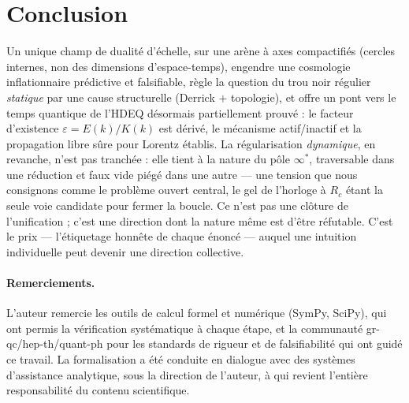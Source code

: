 \documentclass[11pt,a4paper]{article}
\theoremstyle{definition}
\begin{document}
\section{Conclusion}
Un unique champ de dualit\'e d'\'echelle, sur une ar\`ene \`a axes compactifi\'es (cercles
internes, non des dimensions d'espace-temps), engendre une cosmologie inflationnaire pr\'edictive
et falsifiable, r\`egle la question du trou noir r\'egulier \emph{statique} par une cause
structurelle (Derrick $+$ topologie), et offre un pont vers le temps quantique de l'HDEQ
d\'esormais partiellement prouv\'e : le facteur d'existence $\varepsilon=E(k)/K(k)$ est
d\'eriv\'e, le m\'ecanisme actif/inactif et la propagation libre s\^ure pour Lorentz \'etablis.
La r\'egularisation \emph{dynamique}, en revanche, n'est pas tranch\'ee : elle tient \`a la
nature du p\^ole $\infty^*$, traversable dans une r\'eduction et faux vide pi\'eg\'e dans une
autre --- une tension que nous consignons comme le probl\`eme ouvert central, le gel de
l'horloge \`a $R_c$ \'etant la seule voie candidate pour fermer la boucle. Ce n'est pas une
cl\^oture de l'unification ; c'est une direction dont la nature m\^eme est d'\^etre r\'efutable.
C'est le prix --- l'\'etiquetage honn\^ete de chaque \'enonc\'e --- auquel une intuition
individuelle peut devenir une direction collective.

\paragraph{Remerciements.} L'auteur remercie les outils de calcul formel et num\'erique
(SymPy, SciPy), qui ont permis la v\'erification syst\'ematique \`a chaque \'etape, et la
communaut\'e gr-qc/hep-th/quant-ph pour les standards de rigueur et de falsifiabilit\'e qui ont
guid\'e ce travail. La formalisation a \'et\'e conduite en dialogue avec des syst\`emes
d'assistance analytique, sous la direction de l'auteur, \`a qui revient l'enti\`ere
responsabilit\'e du contenu scientifique.

\end{document}
